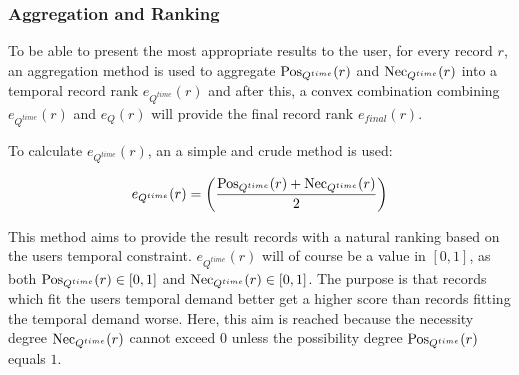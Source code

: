 \begin{table}[h]
\begin{tabular}{|c|c|c|}
\end{tabular}
%
%
%
\label{tab:fuzzy-allen-relations}
\end{table}

\subsubsection{Aggregation and Ranking}
To be able to present the most appropriate results to the user, for every record $r$, an aggregation method is used to aggregate $\operatorname{Pos}_{Q^{time}}(r)$ and $\operatorname{Nec}_{Q^{time}}(r)$ into a temporal record rank $e_{Q^{time}}(r)$ and after this, a convex combination combining $e_{Q^{time}}(r)$ and $e_{Q}(r)$ will provide the final record rank $e_{final}(r)$.


To calculate $e_{Q^{time}}(r)$, an a simple and crude method is used:

\begin{equation}
\label{eq:temporal-eval}
e_{Q^{time}}(r) = \left(\frac{\Pos_{Q^{time}}(r)+\Nec_{Q^{time}}(r)}{2}\right)
\end{equation}

This method aims to provide the result records with a natural ranking based on the users temporal constraint. $e_{Q^{time}}(r)$ will of course be a value in $\left[0,1\right]$, as both $\operatorname{Pos}_{Q^{time}}(r) \in \left[0,1\right]$ and $\operatorname{Nec}_{Q^{time}}(r) \in \left[0,1\right]$. The purpose is that records which fit the users temporal demand better get a higher score than records fitting the temporal demand worse. Here, this aim is reached because the necessity degree $\operatorname{Nec}_{Q^{time}}(r)$ cannot exceed $0$ unless the possibility degree $\operatorname{Pos}_{Q^{time}}(r)$ equals $1$.


